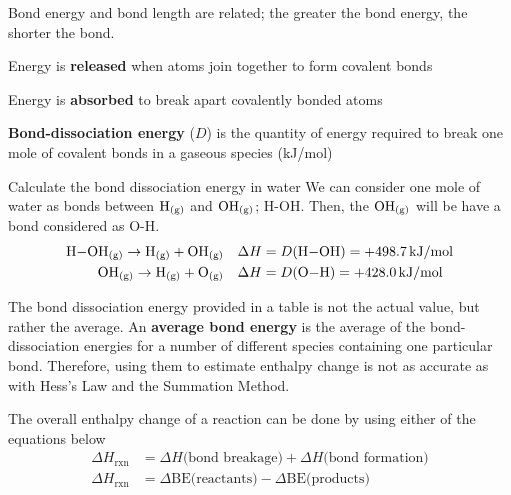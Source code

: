 Bond energy and bond length are related; the greater the bond energy, the shorter the bond. 
\begin{bulleted-list}
    \item Energy is \textbf{released} when atoms join together to form covalent bonds
    \item Energy is \textbf{absorbed} to break apart covalently bonded atoms
    \item \textbf{Bond-dissociation energy} ($D$) is the quantity of energy required to break one
        mole of covalent bonds in a gaseous species (kJ/mol)
\end{bulleted-list}

\begin{sample}{Calculate the bond dissociation energy in water}
    We can consider one mole of water as bonds between $\ch{H_{(g)}}$ and $\ch{OH_{(g)}}$; H-OH. 
    Then, the $\ch{OH_{(g)}}$ will be have a bond considered as O-H.
    \begin{align*}
        \ch{H-OH_{(g)}}\to \ch{H_{(g)}}+\ch{OH_{(g)}}\quad&\Delta H=D(\ch{H-OH})=+498.7\,\si{kJ/mol}\\
        \ch{OH_{(g)}}\to \ch{H_{(g)}}+\ch{O_{(g)}}\quad&\Delta H=D(\ch{O-H})=+428.0\,\si{kJ/mol}
    \end{align*}
\end{sample}

\begin{important}
    The bond dissociation energy provided in a table is not the actual value, but rather the average.
    An \textbf{average bond energy} is the average of the bond-dissociation energies for a number
    of different species containing one particular bond. Therefore, using them to estimate 
    enthalpy change is not as accurate as with Hess's Law and the Summation Method.
\end{important}

The overall enthalpy change of a reaction can be done by using either of the equations below
\begin{align*}
    \Delta H_\text{rxn}&=\Delta H\text{(bond breakage)}+\Delta H\text{(bond formation)}\\
    \Delta H_\text{rxn}&=\Delta\text{BE(reactants)}-\Delta\text{BE(products)}
\end{align*}
